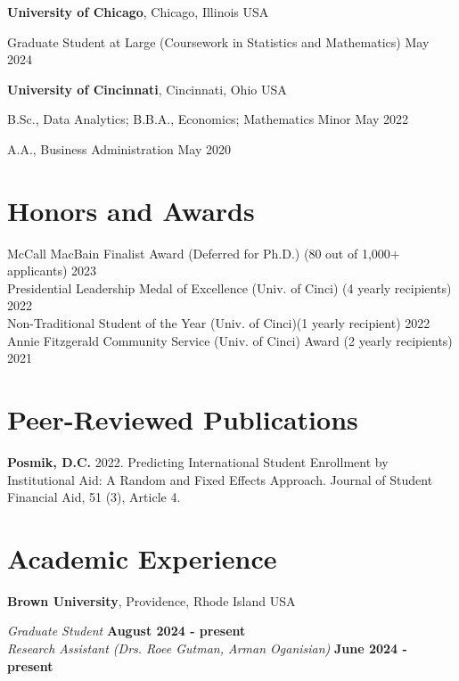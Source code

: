 \documentclass[margin,line]{res}
\newenvironment{list1}{
  \begin{list}{\ding{113}}{%
      \setlength{\itemsep}{0in}
      \setlength{\parsep}{0in} \setlength{\parskip}{0in}
      \setlength{\topsep}{0in} \setlength{\partopsep}{0in} 
      \setlength{\leftmargin}{0.17in}}}{\end{list}}
\begin{document}
\begin{resume}
{\bf University of Chicago}, Chicago, Illinois USA\\
\vspace*{-.1in}
\begin{list1}
\item[] Graduate Student at Large (Coursework in Statistics and Mathematics) \hfill May 2024
\end{list1}

{\bf University of Cincinnati}, Cincinnati, Ohio USA\\
\vspace*{-.1in}
\begin{list1}
\item[] B.Sc., Data Analytics; B.B.A., Economics; Mathematics Minor \hfill May 2022
\item[] A.A., Business Administration \hfill May 2020
\end{list1}


\section{\sc Honors and Awards} 
McCall MacBain Finalist Award (Deferred for Ph.D.) (80 out of 1,000+ applicants) \hfill 2023 \\  
Presidential Leadership Medal of Excellence (Univ. of Cinci) (4 yearly recipients) \hfill 2022 \\ 
Non-Traditional Student of the Year (Univ. of Cinci)(1 yearly recipient) \hfill 2022 \\
Annie Fitzgerald Community Service (Univ. of Cinci) Award (2 yearly recipients) \hfill 2021


\section{\sc Peer-Reviewed Publications}
{\bf Posmik, D.C.} 2022. Predicting International Student Enrollment by Institutional Aid: A Random and Fixed Effects Approach. Journal of Student Financial Aid, 51 (3), Article 4.  


\section{\sc Academic Experience}
{\bf Brown University}, Providence, Rhode Island USA

\vspace{-.3cm}
{\em Graduate Student} \hfill {\bf August 2024 - present}\\
{\em Research Assistant (Drs. Roee Gutman, Arman Oganisian)} \hfill {\bf June 2024 - present}\\


\end{resume}
\end{document}
